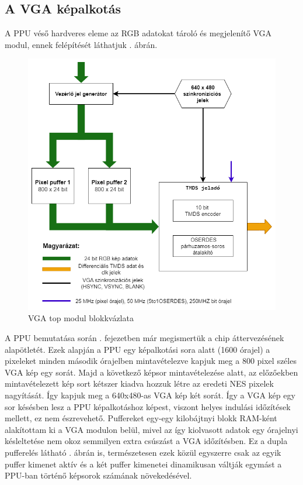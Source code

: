 	\subsection{A VGA képalkotás}
	
	A PPU véső hardveres eleme az RGB adatokat tároló és megjelenítő VGA modul, ennek felépítését láthatjuk . ábrán. 
	
	\begin{figure}[H]
		\centering
		\includegraphics[width=120mm, keepaspectratio]{figures/vga-top-diagram}
		\caption{VGA top modul blokkvázlata} 
		\label{fig:vga-rendering-top}
	\end{figure} 

	A PPU bemutatása során . fejezetben már megismertük a chip áttervezésének alapötletét. Ezek alapján a PPU egy képalkotási sora alatt (1600 órajel) a pixeleket minden második órajelben mintavételezve kapjuk meg a 800 pixel széles VGA kép egy sorát. Majd a következő képsor mintavételezése alatt, az előzőekben mintavételezett kép sort kétszer kiadva hozzuk létre az eredeti NES pixelek nagyítását. Így kapjuk meg a 640x480-as VGA kép két sorát. Így a VGA kép egy sor késésben lesz a PPU képalkotáshoz képest, viszont helyes indulási időzítések mellett, ez nem észrevehető. Puffereket egy-egy kilobájtnyi blokk RAM-ként alakítottam ki a VGA modulon belül, mivel az így kiolvasott adatok egy órajelnyi késleltetése nem okoz semmilyen extra csúszást a VGA időzítésben. Ez a dupla pufferelés látható . ábrán is, természetesen ezek közül egyszerre csak az egyik puffer kimenet aktív és a két puffer kimenetei dinamikusan váltják egymást a PPU-ban történő képsorok számának növekedésével.
	
